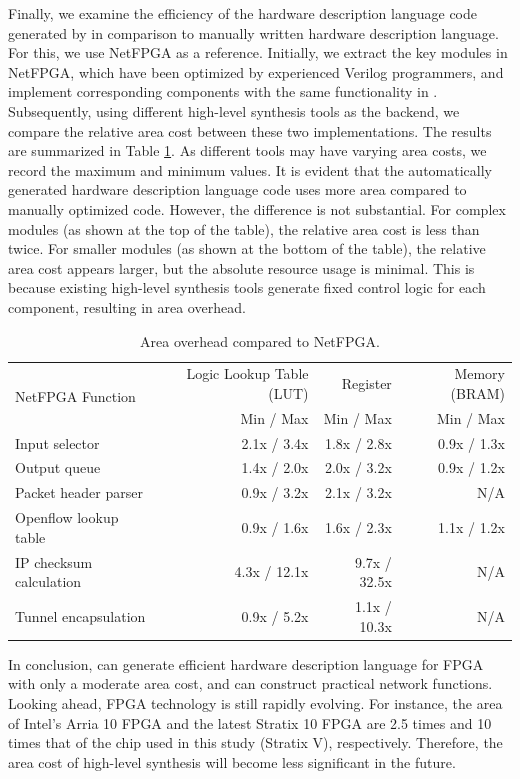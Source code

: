 Finally, we examine the efficiency of the hardware description language code generated by \name in comparison to manually written hardware description language. For this, we use NetFPGA \cite {netfpga} as a reference. Initially, we extract the key modules in NetFPGA, which have been optimized by experienced Verilog programmers, and implement corresponding components with the same functionality in \name. Subsequently, using different high-level synthesis tools as the backend, we compare the relative area cost between these two implementations. The results are summarized in Table \ref {clicknp:tab:netfpga}. As different tools may have varying area costs, we record the maximum and minimum values. It is evident that the automatically generated hardware description language code uses more area compared to manually optimized code. However, the difference is not substantial. For complex modules (as shown at the top of the table), the relative area cost is less than twice. For smaller modules (as shown at the bottom of the table), the relative area cost appears larger, but the absolute resource usage is minimal. This is because existing high-level synthesis tools generate fixed control logic for each component, resulting in area overhead.

\begin{table}[htbp]
	\centering
	\caption{Area overhead compared to NetFPGA.}
	\label{clicknp:tab:netfpga}
	\small
		\begin{tabular}{l|r|r|r}
			\toprule
			\multirow{2}{2.2cm}{NetFPGA Function} & Logic Lookup Table (LUT) & Register & Memory (BRAM) \\
			& Min / Max & Min / Max & Min / Max \\
			\midrule
			Input selector  & 2.1x / 3.4x & 1.8x / 2.8x & 0.9x / 1.3x \\
			Output queue   & 1.4x / 2.0x & 2.0x / 3.2x & 0.9x / 1.2x \\
			Packet header parser  & 0.9x / 3.2x & 2.1x / 3.2x & N/A \\
			Openflow lookup table & 0.9x / 1.6x & 1.6x / 2.3x & 1.1x / 1.2x \\
			\midrule
			\midrule
			IP checksum calculation    & 4.3x / 12.1x & 9.7x / 32.5x & N/A \\
			Tunnel encapsulation          & 0.9x / 5.2x & 1.1x / 10.3x & N/A \\
			\bottomrule
		\end{tabular}
\end{table}

In conclusion, \name can generate efficient hardware description language for FPGA with only a moderate area cost, and can construct practical network functions. Looking ahead, FPGA technology is still rapidly evolving. For instance, the area of Intel's Arria 10 FPGA and the latest Stratix 10 FPGA are 2.5 times and 10 times that of the chip used in this study (Stratix V), respectively. Therefore, the area cost of high-level synthesis will become less significant in the future.

